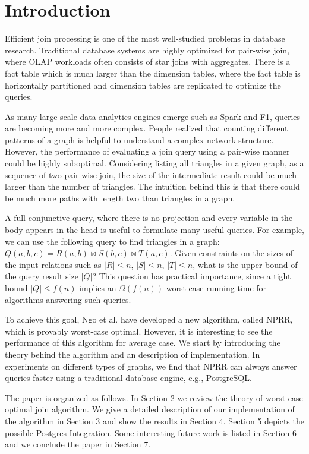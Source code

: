 \section{Introduction}

Efficient join processing is one of the most well-studied problems in database research. Traditional database systems are highly optimized for pair-wise join, where OLAP workloads often consists of star joins with aggregates. There is a fact table which is much larger than the dimension tables, where the fact table is horizontally partitioned and dimension tables are replicated to optimize the queries. 

As many large scale data analytics engines emerge such as Spark and F1, queries are becoming more and more complex. People realized that counting different patterns of a graph is helpful to understand a complex network structure. However, the performance of evaluating a join query using a pair-wise manner could be highly suboptimal. Considering listing all triangles in a given graph, as a sequence of two pair-wise join, the size of the intermediate result could be much larger than the number of triangles. The intuition behind this is that there could be much more paths with length two than triangles in a graph. 


A full conjunctive query, where there is no projection and every variable in the body appears in the head is useful to formulate many useful queries. For example, we can use the following query to find triangles in a graph: $Q(a, b, c) = R(a, b) \Join S(b, c) \Join T(a, c)$. Given constraints on the sizes of the input relations such as $|R| \leq n$, $|S| \leq n$, $|T| \leq n$, what is the upper bound of the  query result size $|Q|$? This question has practical importance, since a tight bound $|Q| \leq f(n)$ implies an $\Omega (f(n))$ worst-case running time for algorithms answering such queries.

To achieve this goal, Ngo et al. have developed a new algorithm, called NPRR, which is provably worst-case optimal. However, it is interesting to see the performance of this algorithm for average case. We start by introducing the theory behind the algorithm and an description of implementation. In experiments on different types of graphs, we find that NPRR can always answer queries faster using a traditional database engine, e.g., PostgreSQL. 
 
 
The paper is organized as follows. In Section 2 we review the theory of worst-case optimal join algorithm. We give a detailed description of our implementation of the algorithm in Section 3 and show the results in Section 4. Section 5 depicts the possible Postgres Integration. Some interesting future work is listed in Section 6 and we conclude the paper in Section 7.
